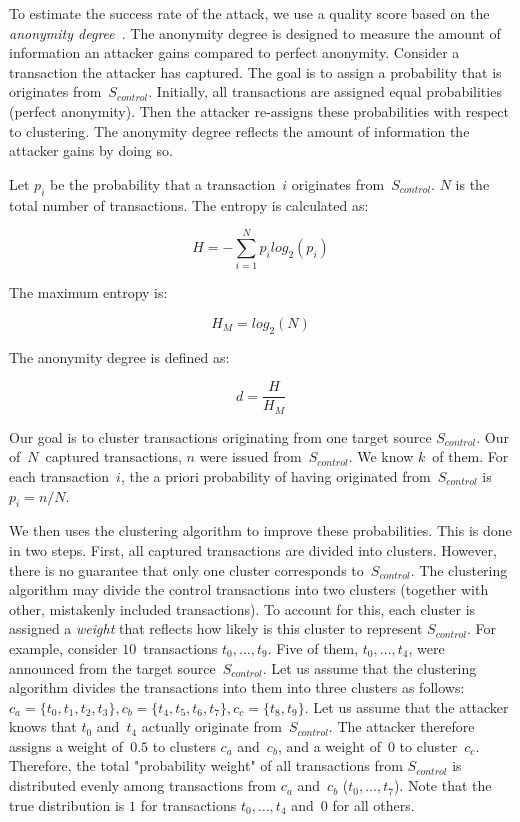 To estimate the success rate of the attack, we use a quality score based on the \textit{anonymity degree}~\cite{Diaz2002}.
The anonymity degree is designed to measure the amount of information an attacker gains compared to perfect anonymity.
Consider a transaction the attacker has captured.
The goal is to assign a probability that is originates from~$S_{control}$.
Initially, all transactions are assigned equal probabilities (perfect anonymity).
Then the attacker re-assigns these probabilities with respect to clustering.
The anonymity degree reflects the amount of information the attacker gains by doing so.

Let $p_i$ be the probability that a transaction~$i$ originates from~$S_{control}$.
$N$ is the total number of transactions.
The entropy is calculated as:

\[
H = -\sum_{i=1}^N p_i log_2(p_i)
\]

The maximum entropy is:

\[
H_M = log_2(N)
\]

The anonymity degree is defined as:

\[
d = \frac{H}{H_M}
\]


Our goal is to cluster transactions originating from one target source $S_{control}$.
Our of~$N$~captured transactions, $n$ were issued from~$S_{control}$.
We know $k$~of them.
For each transaction~$i$, the a priori probability of having originated from~$S_{control}$ is $p_i = n / N$.

We then uses the clustering algorithm to improve these probabilities.
This is done in two steps.
First, all captured transactions are divided into clusters.
However, there is no guarantee that only one cluster corresponds to~$S_{control}$.
The clustering algorithm may divide the control transactions into two clusters (together with other, mistakenly included transactions).
To account for this, each cluster is assigned a \textit{weight} that reflects how likely is this cluster to represent $S_{control}$.
For example, consider $10$~transactions $t_0, \dots, t_9$.
Five of them, $t_0, \dots, t_4$, were announced from the target source~$S_{control}$.
Let us assume that the clustering algorithm divides the transactions into them into three clusters as follows: $c_a = \{t_0, t_1, t_2, t_3\}, c_b = \{t_4, t_5, t_6, t_7\}, c_c = \{t_8, t_9\}$.
Let us assume that the attacker knows that $t_0$ and~$t_4$ actually originate from~$S_{control}$.
The attacker therefore assigns a weight of~$0.5$ to clusters $c_a$ and~$c_b$, and a weight of~$0$ to cluster~$c_c$.
Therefore, the total "probability weight" of all transactions from $S_{control}$ is distributed evenly among transactions from $c_a$ and~$c_b$ ($t_0, \dots, t_7$).
Note that the true distribution is $1$ for transactions $t_0, \dots, t_4$ and~$0$ for all others.

